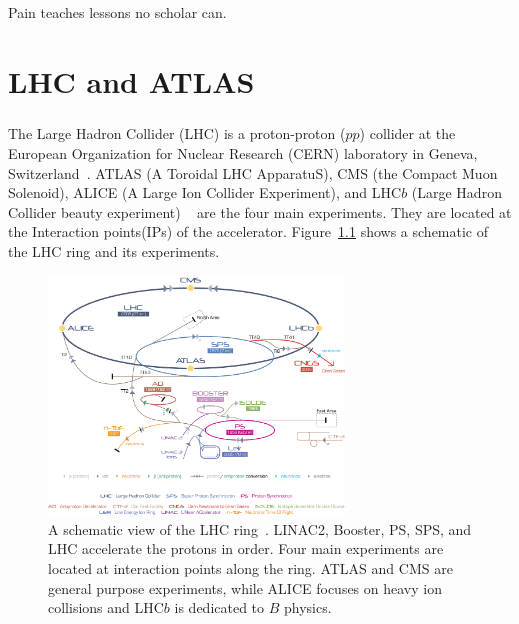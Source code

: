 \begin{savequote}[75mm]
Pain teaches lessons no scholar can.
\end{savequote}

\chapter{LHC and ATLAS}
\paragraph{}
The Large Hadron Collider (LHC) is a proton-proton ($pp$) collider at the European Organization for Nuclear Research (CERN) laboratory in Geneva, Switzerland~\cite{LHCPaper}.  ATLAS (A Toroidal LHC ApparatuS), CMS (the Compact Muon Solenoid), ALICE (A Large Ion Collider Experiment), and LHC$b$ (Large Hadron Collider beauty experiment) ~\cite{ATLASPaper, CMSPaper, LHCbPaper, ALICEPaper} are the four main experiments. They are located at the Interaction points(IPs) of the accelerator. Figure~\ref{fig:LHC} shows a schematic of the LHC ring and its experiments. 

\begin{figure}[htbp!]
  \centering
  \captionsetup{justification=centering}
  \includegraphics[width=0.7\textwidth]{figures/detector/Cern-Accelerator-Complex.jpg}
   \caption{A schematic view of the LHC ring~\cite{LHCReview}. LINAC2, Booster, PS, SPS, and LHC accelerate the protons in order. Four main experiments are located at interaction points along the ring. ATLAS and CMS are general purpose experiments, while ALICE focuses on heavy ion collisions and LHC$b$ is dedicated to $B$ physics.}
  \label{fig:LHC}
\end{figure}

